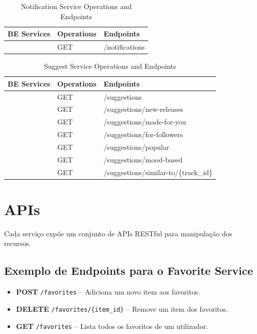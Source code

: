 \documentclass[a4paper,12pt]{article}
\begin{document}
\begin{table}[H]
    \centering
    \renewcommand{\arraystretch}{1.2}
    \begin{tabular}{|>{\centering\arraybackslash}m{4.0cm}|m{2.5cm}|m{7.5cm}|}
    \hline
    \textbf{BE Services} & \textbf{Operations} & \textbf{Endpoints} \\
    \hline
    \multirow{1}{*}{\textbf{Notification Service}} 
    & GET & /notifications \\
    \hline
    \end{tabular}
    \caption{Notification Service Operations and Endpoints}
\end{table}

\begin{table}[H]
    \centering
    \renewcommand{\arraystretch}{1.2}
    \setlength{\tabcolsep}{5pt}
    \begin{tabular}{|>{\centering\arraybackslash}m{4.0cm}|m{2.5cm}|m{7.5cm}|}
    \hline
    \textbf{BE Services} & \textbf{Operations} & \textbf{Endpoints} \\
    \hline
    \multirow{7}{*}{\textbf{Suggest Service}} 
    & GET & /suggestions \\
    & GET & /suggestions/new-releases \\
    & GET & /suggestions/made-for-you \\
    & GET & /suggestions/for-followers \\
    & GET & /suggestions/popular \\
    & GET & /suggestions/mood-based \\
    & GET & /suggestions/similar-to/\{track\_id\} \\
    \hline
    \end{tabular}
    \caption{Suggest Service Operations and Endpoints}
\end{table}

\clearpage %

\section{APIs}
Cada serviço expõe um conjunto de APIs RESTful para manipulação dos recursos.

\subsection{Exemplo de Endpoints para o Favorite Service}
\begin{itemize}
    \item \textbf{POST} \texttt{/favorites} – Adiciona um novo item aos favoritos.
    \item \textbf{DELETE} \texttt{/favorites/\{item\_id\}} – Remove um item dos favoritos.
    \item \textbf{GET} \texttt{/favorites} – Lista todos os favoritos de um utilizador.
\end{itemize}
\end{document}
